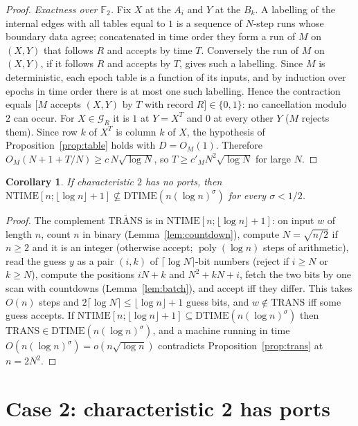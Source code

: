 \documentclass[11pt]{article}
\newtheorem{corollary}[theorem]{Corollary}
\theoremstyle{definition}
\theoremstyle{remark}
\newcommand{\F}{\mathbb F}
\newcommand{\DTIME}{\mathrm{DTIME}}
\newcommand{\NTIME}{\mathrm{NTIME}}
\newcommand{\TRANS}{\mathrm{TRANS}}
\begin{document}
\begin{proof}
\emph{Exactness over $\F_2$.} Fix $X$ at the $A_i$ and $Y$ at the $B_k$. A labelling of the internal edges with all tables
equal to $1$ is a sequence of $N$-step runs whose boundary data agree; concatenated in time order they form a run of $M$ on
$(X,Y)$ that follows $R$ and accepts by time $T$. Conversely the run of $M$ on $(X,Y)$, if it follows $R$ and accepts by $T$,
gives such a labelling. Since $M$ is deterministic, each epoch table is a function of its inputs, and by induction over epochs in
time order there is at most one such labelling. Hence the contraction equals $[M$ accepts $(X,Y)$ by $T$ with record $R]\in\{0,1\}$:
no cancellation modulo~$2$ can occur. For $X\in\mathcal G_R$ it is $1$ at $Y=X^T$ and $0$ at every other $Y$ ($M$ rejects them).
Since row $k$ of $X^T$ is column $k$ of $X$, the hypothesis of Proposition~\ref{prop:table} holds with $D=O_M(1)$. Therefore
$O_M(N+1+T/N)\ge c\,N\sqrt{\log N}$, so $T\ge c'_MN^2\sqrt{\log N}$ for large $N$.
\end{proof}

\begin{corollary}\label{cor:case1}
If characteristic $2$ has no ports, then $\NTIME[n;\lfloor\log n\rfloor+1]\not\subseteq\DTIME(n(\log n)^{\sigma})$ for every $\sigma<1/2$.
\end{corollary}
\begin{proof}
The complement $\overline{\TRANS}$ is in $\NTIME[n;\lfloor\log n\rfloor+1]$: on input $w$ of length $n$, count $n$ in binary
(Lemma~\ref{lem:countdown}), compute $N=\sqrt{n/2}$ if $n\ge2$ and it is an integer (otherwise accept; $\operatorname{poly}(\log n)$ steps of
arithmetic), read the guess $y$ as a pair $(i,k)$ of $\lceil\log N\rceil$-bit numbers (reject if $i\ge N$ or $k\ge N$), compute
the positions $iN+k$ and $N^2+kN+i$, fetch the two bits by one scan with countdowns (Lemma~\ref{lem:batch}), and accept iff they
differ. This takes $O(n)$ steps and $2\lceil\log N\rceil\le\lfloor\log n\rfloor+1$ guess bits, and $w\notin\TRANS$ iff some guess accepts.
If $\NTIME[n;\lfloor\log n\rfloor+1]\subseteq\DTIME(n(\log n)^\sigma)$ then $\TRANS\in\DTIME(n(\log n)^\sigma)$, and a machine running in time
$O(n(\log n)^\sigma)=o(n\sqrt{\log n})$ contradicts Proposition~\ref{prop:trans} at $n=2N^2$.
\end{proof}

\section{Case 2: characteristic 2 has ports}\label{sec:case2}
\end{document}
